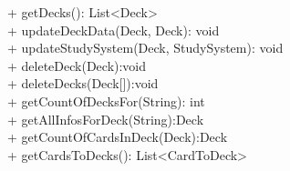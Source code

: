{ 
    + getDecks(): List<Deck> \\ 
    + updateDeckData(Deck, Deck): void\\
    + updateStudySystem(Deck, StudySystem): void\\
    + deleteDeck(Deck):void\\
    + deleteDecks(Deck[]):void\\
    + getCountOfDecksFor(String): int\\
    + getAllInfosForDeck(String):Deck\\
    + getCountOfCardsInDeck(Deck):Deck\\
    + getCardsToDecks(): List<CardToDeck>\\
}{} 